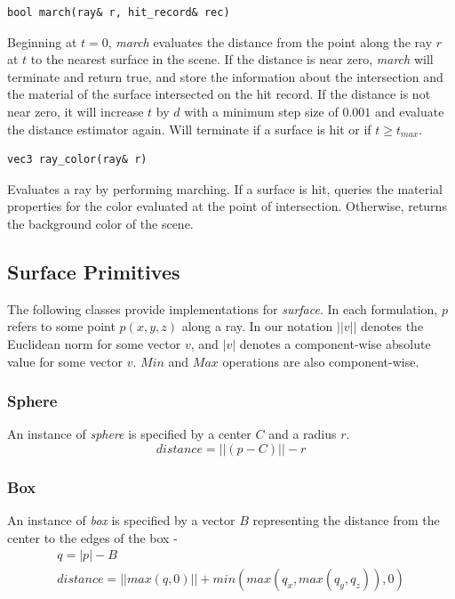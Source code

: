 \documentclass[sigconf, nonacm]{acmart}
\begin{document}
\begin{lstlisting}
bool march(ray& r, hit_record& rec)
\end{lstlisting}

Beginning at $t = 0$, \textit{march} evaluates the distance from the point along the ray $r$ at $t$ to the nearest surface in the scene. If the distance is near zero, \textit{march} will terminate and return true, and store the information about the intersection and the material of the surface intersected on the hit record. If the distance is not near zero, it will increase $t$ by $d$ with a minimum step size of $0.001$ and evaluate the distance estimator again. Will terminate if a surface is hit or if $t \geq t_{max}$.

\begin{lstlisting}
vec3 ray_color(ray& r)
\end{lstlisting}

Evaluates a ray by performing marching. If a surface is hit, queries the material properties for the color evaluated at the point of intersection. Otherwise, returns the background color of the scene.

\subsection{Surface Primitives}

The following classes provide implementations for \textit{surface}. In each formulation, $p$ refers to some point $p(x,y,z)$ along a ray. In our notation $||v||$ denotes the Euclidean norm for some vector $v$, and $|v|$ denotes a component-wise absolute value for some vector $v$. $Min$ and $Max$ operations are also component-wise.

\subsubsection{Sphere}

An instance of \textit{sphere} is specified by a center $C$ and a radius $r$.
$$
distance = ||(p - C)|| - r
$$

\subsubsection{Box}

An instance of \textit{box} is specified by a vector $B$ representing the distance from the center to the edges of the box -
\begin{gather*}
q = |p| - B\\
distance = ||max(q,0)|| + min(max(q_x,max(q_y,q_z)),0)
\end{gather*}
\end{document}
